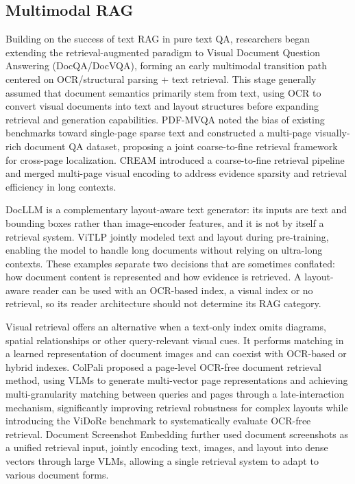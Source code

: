 \subsection{Multimodal RAG}
Building on the success of text RAG in pure text QA, researchers began extending the retrieval-augmented paradigm to Visual Document Question Answering (DocQA/DocVQA), forming an early multimodal transition path centered on OCR/structural parsing + text retrieval. This stage generally assumed that document semantics primarily stem from text, using OCR to convert visual documents into text and layout structures before expanding retrieval and generation capabilities. PDF-MVQA \cite{ding2024mvqa} noted the bias of existing benchmarks toward single-page sparse text and constructed a multi-page visually-rich document QA dataset, proposing a joint coarse-to-fine retrieval framework for cross-page localization. CREAM \cite{zhang2024cream} introduced a coarse-to-fine retrieval pipeline and merged multi-page visual encoding to address evidence sparsity and retrieval efficiency in long contexts.

DocLLM \cite{wang2024docllm} is a complementary layout-aware text generator: its inputs are text and bounding boxes rather than image-encoder features, and it is not by itself a retrieval system. ViTLP \cite{mao2024visually} jointly modeled text and layout during pre-training, enabling the model to handle long documents without relying on ultra-long contexts. These examples separate two decisions that are sometimes conflated: how document content is represented and how evidence is retrieved. A layout-aware reader can be used with an OCR-based index, a visual index or no retrieval, so its reader architecture should not determine its RAG category.

Visual retrieval offers an alternative when a text-only index omits diagrams, spatial relationships or other query-relevant visual cues. It performs matching in a learned representation of document images and can coexist with OCR-based or hybrid indexes. ColPali \cite{faysse2024colpali} proposed a page-level OCR-free document retrieval method, using VLMs to generate multi-vector page representations and achieving multi-granularity matching between queries and pages through a late-interaction mechanism, significantly improving retrieval robustness for complex layouts while introducing the ViDoRe benchmark to systematically evaluate OCR-free retrieval. Document Screenshot Embedding \cite{ma2024unifying} further used document screenshots as a unified retrieval input, jointly encoding text, images, and layout into dense vectors through large VLMs, allowing a single retrieval system to adapt to various document forms.


